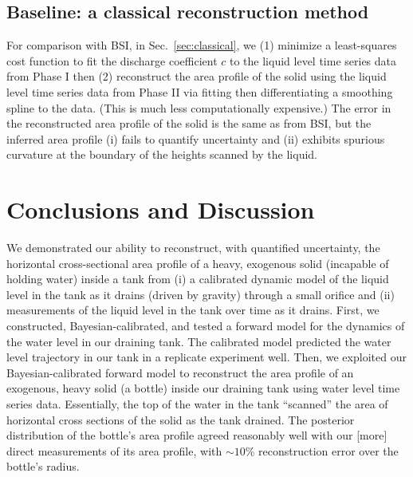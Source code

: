 \documentclass[a4paper,fleqn]{cas-dc}
\begin{document}
\subsection{Baseline: a classical reconstruction method}
For comparison with BSI, in Sec.~\ref{sec:classical}, we (1) minimize a least-squares cost function to fit the discharge coefficient $c$ to the liquid level time series data from Phase I then (2) reconstruct the area profile of the solid using the liquid level time series data from Phase II via fitting then differentiating a smoothing spline to the data. (This is much less computationally expensive.)
The error in the reconstructed area profile of the solid is the same as from BSI, but the inferred area profile (i) fails to quantify uncertainty and (ii) exhibits spurious curvature at the boundary of the heights scanned by the liquid.


\section{Conclusions and Discussion}
We demonstrated our ability to reconstruct, with quantified uncertainty, the horizontal cross-sectional area profile of a heavy, exogenous solid (incapable of holding water) inside a tank from (i) a calibrated dynamic model of the liquid level in the tank as it drains (driven by gravity) through a small orifice and (ii) measurements of the liquid level in the tank over time as it drains.
First, we constructed, Bayesian-calibrated, and tested a forward model for the dynamics of the water level in our draining tank.
The calibrated model predicted the water level trajectory in our tank in a replicate experiment well.
Then, we exploited our Bayesian-calibrated forward model to reconstruct the area profile of an exogenous, heavy solid (a bottle) inside our draining tank using water level time series data. 
Essentially, the top of the water in the tank ``scanned'' the area of horizontal cross sections of the solid as the tank drained. 
The posterior distribution of the bottle's area profile agreed reasonably well with our [more] direct measurements of its area profile, with $\sim 10$\% reconstruction error over the bottle's radius. 
\end{document}
